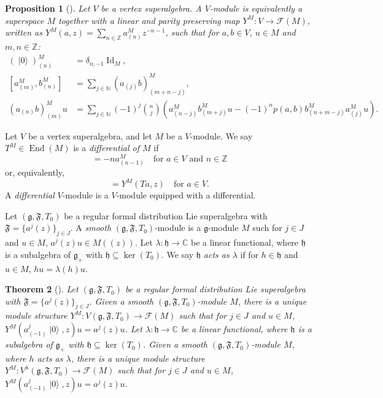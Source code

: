 \documentclass[a4paper, 12pt, reqno]{amsart}
\newtheorem{theorem}{Theorem}[section]
\newtheorem{proposition}[theorem]{Proposition}
\theoremstyle{remark}
\DeclareMathOperator{\Id}{Id}
\DeclareMathOperator{\End}{End}
\DeclareMathOperator{\vac}{|0\rangle}
\begin{document}
\begin{proposition}[{\cite[\S3]{dong_twisted_1998}}]
  \label{prp:9}
  Let $V$ be a vertex superalgebra.
  A $V$-module is equivalently a superspace $M$ together with a linear and parity preserving map $Y^M: V \to \mathcal{F}(M)$, written as $Y^M(a, z) = \sum_{n \in \mathbb{Z}}a^M_{(n)}z^{-n - 1}$, such that for $a, b \in V$, $u \in M$ and $m, n \in \mathbb{Z}$:
  \begin{align}
    \label{eq:23}
    (\vac)^M_{(n)} &= \delta_{n, -1}\Id_M, \\
    \label{eq:24}
    [a^M_{(m)}, b^M_{(n)}] &= \sum_{j \in \mathbb{N}}(a_{(j)}b)^M_{(m + n - j)}, \\
    \label{eq:25}
    (a_{(n)}b)^M_{(m)}u &= \sum_{j \in \mathbb{N}}(-1)^j\binom{n}{j}(a^M_{(n - j)}b^M_{(m + j)}u - (-1)^np(a, b)b^M_{(n + m - j)}a^M_{(j)}u).
  \end{align}
\end{proposition}

Let $V$ be a vertex superalgebra, and let $M$ be a $V$-module.
We say  $T^M \in \End(M)$ is a \emph{differential of $M$} if
\begin{equation*}
  [T^M, a^M_{(n)}] = -na^M_{(n - 1)} \quad \text{for $a \in V$ and $n \in \mathbb{Z}$}
\end{equation*}
or, equivalently,
\begin{equation*}
  [T^M, Y^M(a, z)] = Y^M(Ta, z) \quad \text{for $a \in V$}.
\end{equation*}
A \emph{differential} $V$-module is a $V$-module equipped with a differential.

Let $(\mathfrak{g}, \mathfrak{F}, T_0)$ be a regular formal distribution Lie superalgebra with $\mathfrak{F} = \{a^j(z)\}_{j \in J}$.
A \emph{smooth} $(\mathfrak{g}, \mathfrak{F}, T_0)$-module is a $\mathfrak{g}$-module $M$ such for $j \in J$ and $u \in M$, $a^j(z)u \in M((z))$.
Let $\lambda: \mathfrak{h} \to \mathbb{C}$ be a linear functional, where $\mathfrak{h}$ is a subalgebra of $\mathfrak{g}_+$ with $\mathfrak{h} \subseteq \ker(T_0)$.
We say $\mathfrak{h}$ \emph{acts as $\lambda$} if for $h \in \mathfrak{h}$ and $u \in M$, $hu = \lambda(h)u$.

\begin{theorem}[{\cite[Theorem 2.15]{li_vertex_2004}}]
  \label{thr:25}
  Let $(\mathfrak{g}, \mathfrak{F}, T_0)$ be a regular formal distribution Lie superalgebra with $\mathfrak{F} = \{a^j(z)\}_{j \in J}$.
  Given a smooth $(\mathfrak{g}, \mathfrak{F}, T_0)$-module $M$, there is a unique module structure $Y^M: V(\mathfrak{g}, \mathfrak{F}, T_0) \to \mathcal{F}(M)$ such that for $j \in J$ and $u \in M$, $Y^M(a^j_{(-1)}\vac, z)u = a^j(z)u$.
  Let $\lambda: \mathfrak{h} \to \mathbb{C}$ be a linear functional, where $\mathfrak{h}$ is a subalgebra of $\mathfrak{g}_+$ with $\mathfrak{h} \subseteq \ker(T_0)$.
  Given a smooth $(\mathfrak{g}, \mathfrak{F}, T_0)$-module $M$, where $h$ acts as $\lambda$, there is a unique module structure $Y^M: V^{\lambda}(\mathfrak{g}, \mathfrak{F}, T_0) \to \mathcal{F}(M)$ such that for $j \in J$ and $u \in M$, $Y^M(a^j_{(-1)}\vac, z)u = a^j(z)u$.
\end{theorem}
\end{document}
